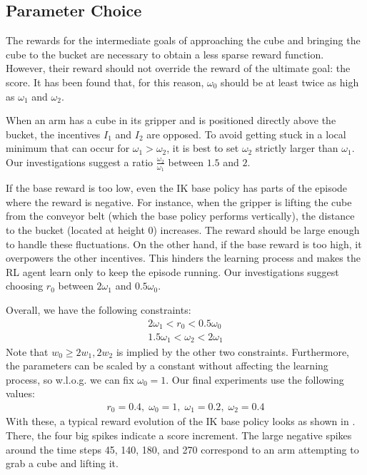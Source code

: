 \documentclass[conference,a4paper]{IEEEtran}
\begin{document}
\subsection{Parameter Choice}

The rewards for the intermediate goals of approaching the cube and bringing the cube to the bucket are necessary to obtain a less sparse reward function. However, their reward should not override the reward of the ultimate goal: the score. It has been found that, for this reason, $\omega_0$ should be at least twice as high as $\omega_1$ and $\omega_2$.

When an arm has a cube in its gripper and is positioned directly above the bucket, the incentives $I_1$ and $I_2$ are opposed. 
To avoid getting stuck in a local minimum that can occur for $\omega_1 > \omega_2$, it is best to set \(\omega_2\)  strictly larger than \(\omega_1\). Our investigations suggest a ratio \(\frac{\omega_2}{\omega_1}\) between \(1.5\) and \(2\).

If the base reward is too low, even the IK base policy has parts of the episode where the reward is negative. For instance, when the gripper is lifting the cube from the conveyor belt (which the base policy performs vertically), the distance to the bucket (located at height 0) increases. The reward should be large enough to handle these fluctuations. On the other hand, if the base reward is too high, it overpowers the other incentives. This hinders the learning process and makes the RL agent learn only to keep the episode running. Our investigations suggest choosing \(r_0\) between $2\omega_1$ and $0.5\omega_0$.

Overall, we have the following constraints:
\begin{align*}
2\omega_1 < r_0 < 0.5 \omega_0 \\
1.5 \omega_1 < \omega_2 < 2\omega_1
\end{align*}
Note that \(w_0 \ge 2w_1, 2w_2\) is implied by the other two constraints. Furthermore, the parameters can be scaled by a constant without affecting the learning process, so w.l.o.g. we can fix \(\omega_0 = 1\). Our final experiments use the following values:
\begin{align*}
r_0 = 0.4, \;\omega_0 = 1, \;\omega_1= 0.2,  \;\omega_2 = 0.4
\end{align*}
With these, a typical reward evolution of the IK base policy looks as shown in .
There, the four big spikes indicate a score increment. The large negative spikes around the time steps 45, 140, 180, and 270 correspond to an arm attempting to grab a cube and lifting it.
\end{document}
